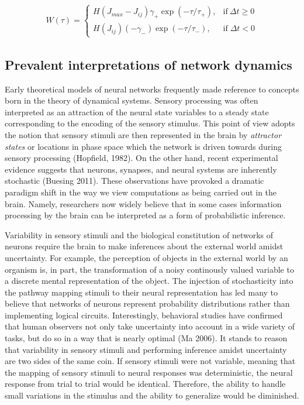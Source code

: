 \documentclass{ucetd}
\begin{document}
\begin{align*}
W(\tau) = \begin{cases}
      H(J_{max}-J_{ij})\gamma_{+}\exp(-\tau/\tau_{+}), & \text{if}\ \Delta t \geq 0 \\
       H(J_{ij})(-\gamma_{-})\exp(-\tau/\tau_{-}), & \text{if} \;\Delta t < 0
    \end{cases}
\end{align*}



\subsection{Prevalent interpretations of network dynamics}

Early theoretical models of neural networks frequently made reference to concepts born in the theory of dynamical systems. Sensory processing was often interpreted as an attraction of the neural state variables to a steady state corresponding to the encoding of the sensory stimulus. This point of view adopts the notion that sensory stimuli are then represented in the brain by \emph{attractor states} or locations in phase space which the network is driven towards during sensory processing (Hopfield, 1982). On the other hand, recent experimental evidence suggests that neurons, synapses, and neural systems are inherently stochastic (Buesing 2011). These observations have provoked a dramatic paradigm shift in the way we view computations as being carried out in the brain. Namely, researchers now widely believe that in some cases information processing by the brain  can be interpreted as a form of probabilistic inference.

Variability in sensory stimuli and the biological constitution of networks of neurons require the brain to make inferences about the external world amidst uncertainty. For example, the perception of objects in the external world by an organism is, in part, the transformation of a noisy continously valued variable to a discrete mental representation of the object. The injection of stochasticity into the pathway mapping stimuli to their neural representation has led many to believe that networks of neurons represent probability distributions rather than implementing logical circuits. Interestingly, behavioral studies have confirmed that human observers not only take uncertainty into account in a wide variety of tasks, but do so in a way that is nearly optimal (Ma 2006). It stands to reason that variability in sensory stimuli and performing inference amidst uncertainty are two sides of the same coin. If sensory stimuli were not variable, meaning that the mapping of sensory stimuli to neural responses was deterministic, the neural response from trial to trial would be identical. Therefore, the ability to handle small variations in the stimulus and the ability to generalize would be diminished.
\end{document}
